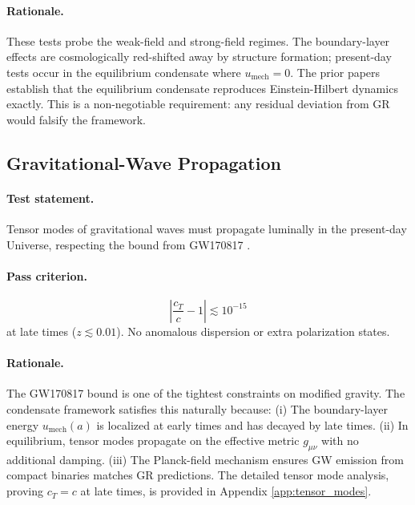 \documentclass[11pt,a4paper]{article}
\newcommand{\umech}{u_{\mathrm{mech}}}
\theoremstyle{definition}
\begin{document}
\paragraph{Rationale.}
These tests probe the weak-field and strong-field regimes. The boundary-layer effects are cosmologically red-shifted away by structure formation; present-day tests occur in the equilibrium condensate where $\umech = 0$. The prior papers \cite{SkavbergMechG2025,SkavbergMechGR2025,SkavbergPlanckField2025} establish that the equilibrium condensate reproduces Einstein-Hilbert dynamics exactly. This is a non-negotiable requirement: any residual deviation from GR would falsify the framework.

\subsection{Gravitational-Wave Propagation}
\label{sec:GW_prop}

\paragraph{Test statement.}
Tensor modes of gravitational waves must propagate luminally in the present-day Universe, respecting the bound from GW170817 \cite{GW170817}.

\paragraph{Pass criterion.}
\begin{equation}
\label{eq:cT_bound}
\left| \frac{c_T}{c} - 1 \right| \lesssim 10^{-15}
\end{equation}
at late times ($z \lesssim 0.01$). No anomalous dispersion or extra polarization states.

\paragraph{Rationale.}
The GW170817 bound is one of the tightest constraints on modified gravity. The condensate framework satisfies this naturally because: (i) The boundary-layer energy $\umech(a)$ is localized at early times and has decayed by late times. (ii) In equilibrium, tensor modes propagate on the effective metric $g_{\mu\nu}$ with no additional damping. (iii) The Planck-field mechanism \cite{SkavbergPlanckField2025} ensures GW emission from compact binaries matches GR predictions. The detailed tensor mode analysis, proving $c_T = c$ at late times, is provided in Appendix \ref{app:tensor_modes}.
\end{document}
